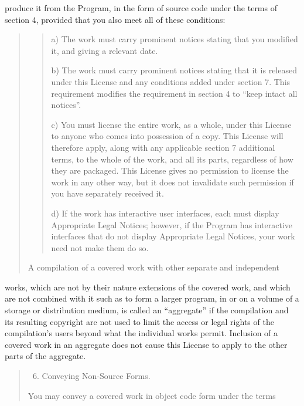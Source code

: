 \documentclass[letterpaper,10pt,english]{sphinxmanual}
\begin{document}
produce it from the Program, in the form of source code under the
terms of section 4, provided that you also meet all of these conditions:
\begin{quote}
\begin{quote}

a) The work must carry prominent notices stating that you modified
it, and giving a relevant date.

b) The work must carry prominent notices stating that it is
released under this License and any conditions added under section
7.  This requirement modifies the requirement in section 4 to
“keep intact all notices”.

c) You must license the entire work, as a whole, under this
License to anyone who comes into possession of a copy.  This
License will therefore apply, along with any applicable section 7
additional terms, to the whole of the work, and all its parts,
regardless of how they are packaged.  This License gives no
permission to license the work in any other way, but it does not
invalidate such permission if you have separately received it.

d) If the work has interactive user interfaces, each must display
Appropriate Legal Notices; however, if the Program has interactive
interfaces that do not display Appropriate Legal Notices, your
work need not make them do so.
\end{quote}

A compilation of a covered work with other separate and independent
\end{quote}

works, which are not by their nature extensions of the covered work,
and which are not combined with it such as to form a larger program,
in or on a volume of a storage or distribution medium, is called an
“aggregate” if the compilation and its resulting copyright are not
used to limit the access or legal rights of the compilation’s users
beyond what the individual works permit.  Inclusion of a covered work
in an aggregate does not cause this License to apply to the other
parts of the aggregate.
\begin{quote}
\begin{enumerate}
\setcounter{enumi}{5}
\item {} 
Conveying Non-Source Forms.

\end{enumerate}

You may convey a covered work in object code form under the terms
\end{quote}
\end{document}
